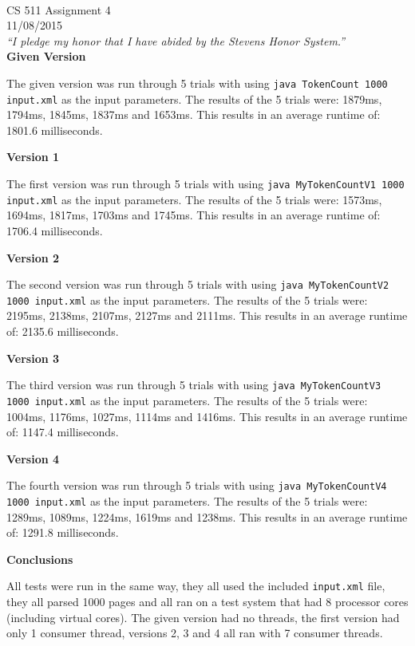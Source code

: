 \documentclass[11pt, letterpaper]{article}
\newcommand{\myheader}[2]
{\noindent{Bradford Smith (bsmith8)}\\
    #1 \\
    #2 \\
    \textit{``I pledge my honor that I have abided by the Stevens Honor System.''}\\
}
\newcommand{\code}[1]{\texttt{#1}}
\begin{document}
\myheader{CS 511 Assignment 4}{11/08/2015}

\bigskip
\noindent\textbf{Given Version}

The given version was run through 5 trials with using \code{java TokenCount 1000 input.xml} as the input parameters. The results of the 5 trials were: 1879ms, 1794ms, 1845ms, 1837ms and 1653ms. This results in an average runtime of: 1801.6 milliseconds.

\bigskip
\noindent\textbf{Version 1}

The first version was run through 5 trials with using \code{java MyTokenCountV1 1000 input.xml} as the input parameters. The results of the 5 trials were: 1573ms, 1694ms, 1817ms, 1703ms and 1745ms. This results in an average runtime of: 1706.4 milliseconds.

\bigskip
\noindent\textbf{Version 2}

The second version was run through 5 trials with using \code{java MyTokenCountV2 1000 input.xml} as the input parameters. The results of the 5 trials were: 2195ms, 2138ms, 2107ms, 2127ms and 2111ms. This results in an average runtime of: 2135.6 milliseconds.

\bigskip
\noindent\textbf{Version 3}

The third version was run through 5 trials with using \code{java MyTokenCountV3 1000 input.xml} as the input parameters. The results of the 5 trials were: 1004ms, 1176ms, 1027ms, 1114ms and 1416ms. This results in an average runtime of: 1147.4 milliseconds.

\bigskip
\noindent\textbf{Version 4}

The fourth version was run through 5 trials with using \code{java MyTokenCountV4 1000 input.xml} as the input parameters. The results of the 5 trials were: 1289ms, 1089ms, 1224ms, 1619ms and 1238ms. This results in an average runtime of: 1291.8 milliseconds.

\bigskip
\noindent\textbf{Conclusions}

All tests were run in the same way, they all used the included \code{input.xml} file, they all parsed 1000 pages and all ran on a test system that had 8 processor cores (including virtual cores). The given version had no threads, the first version had only 1 consumer thread, versions 2, 3 and 4 all ran with 7 consumer threads.
\end{document}
